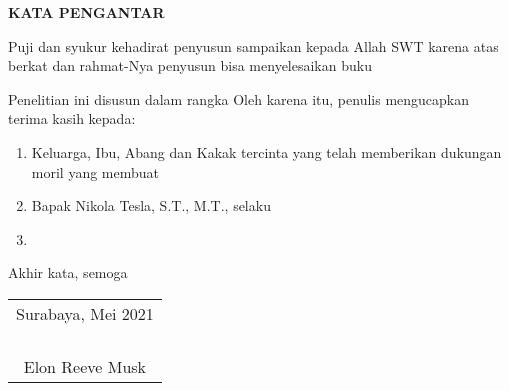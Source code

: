 \begin{center}
  \Large
  \textbf{KATA PENGANTAR}
\end{center}


\vspace{2ex}


Puji dan syukur kehadirat penyusun sampaikan kepada Allah SWT karena atas berkat dan rahmat-Nya penyusun bisa menyelesaikan buku

Penelitian ini disusun dalam rangka \lipsum[2][1-5]
Oleh karena itu, penulis mengucapkan terima kasih kepada:

\begin{enumerate}[nolistsep]

  \item Keluarga, Ibu, Abang dan Kakak tercinta yang telah memberikan dukungan moril yang membuat

  \item Bapak Nikola Tesla, S.T., M.T., selaku \lipsum[4][1-2]

  \item \lipsum[5][1-3]

\end{enumerate}

Akhir kata, semoga \lipsum[6][1-8]

\begin{flushright}
  \begin{tabular}[b]{c}
    Surabaya, Mei 2021\\
    \\
    \\
    \\
    \\
    Elon Reeve Musk
  \end{tabular}
\end{flushright}
